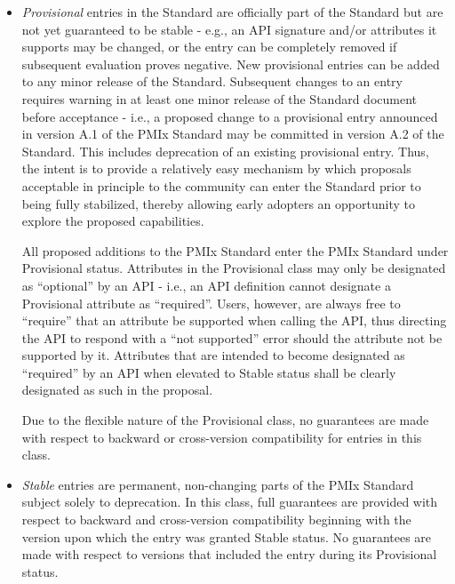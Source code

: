 \documentclass{article}
\begin{document}
\begin{itemize}
\item
  \textit{Provisional} entries in the Standard are officially part
  of the Standard but are not yet guaranteed to be stable - e.g., an API
  signature and/or attributes it supports may be changed, or the entry
  can be completely removed if subsequent evaluation proves negative.
  New provisional entries can be added to any minor release of the
  Standard. Subsequent changes to an entry requires warning in at least
  one minor release of the Standard document before acceptance - i.e., a
  proposed change to a provisional entry announced in version A.1 of the
  PMIx Standard may be committed in version A.2 of the Standard. This
  includes deprecation of an existing provisional entry. Thus, the
  intent is to provide a relatively easy mechanism by which proposals
  acceptable in principle to the community can enter the Standard prior
  to being fully stabilized, thereby allowing early adopters an
  opportunity to explore the proposed capabilities.

  All proposed additions to the PMIx Standard enter the PMIx Standard
  under Provisional status. Attributes in the Provisional class may
  only be designated as ``optional'' by an API - i.e., an API definition
  cannot designate a Provisional attribute as ``required''. Users,
  however, are always free to ``require'' that an attribute be supported
  when calling the API, thus directing the API to respond with a ``not
  supported'' error should the attribute not be supported by it.
  Attributes that are intended to become designated as ``required'' by
  an API when elevated to Stable status shall be clearly designated
  as such in the proposal.

  Due to the flexible nature of the Provisional class, no guarantees are
  made with respect to backward or cross-version compatibility for
  entries in this class.
\item
  \textit{Stable} entries are permanent, non-changing parts of the
  PMIx Standard subject solely to deprecation. In this class, full
  guarantees are provided with respect to backward and cross-version
  compatibility beginning with the version upon which the entry was
  granted Stable status. No guarantees are made with respect to
  versions that included the entry during its Provisional status.


\end{itemize}
\end{document}
